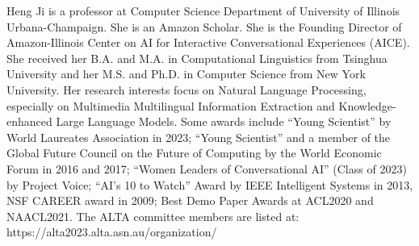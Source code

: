 Heng Ji is a professor at Computer Science Department of University of Illinois Urbana-Champaign. She is an Amazon Scholar. She is the Founding Director of Amazon-Illinois Center on AI for Interactive Conversational Experiences (AICE). She received her B.A. and M.A. in Computational Linguistics from Tsinghua University and her M.S. and Ph.D. in Computer Science from New York University. Her research interests focus on Natural Language Processing, especially on Multimedia Multilingual Information Extraction and Knowledge-enhanced Large Language Models. Some awards include “Young Scientist” by World Laureates Association in 2023; “Young Scientist” and a member of the Global Future Council on the Future of Computing by the World Economic Forum in 2016 and 2017; “Women Leaders of Conversational AI” (Class of 2023) by Project Voice; “AI’s 10 to Watch” Award by IEEE Intelligent Systems in 2013, NSF CAREER award in 2009; Best Demo Paper Awards at ACL2020 and NAACL2021.
The ALTA committee members are listed at:
https://alta2023.alta.asn.au/organization/
